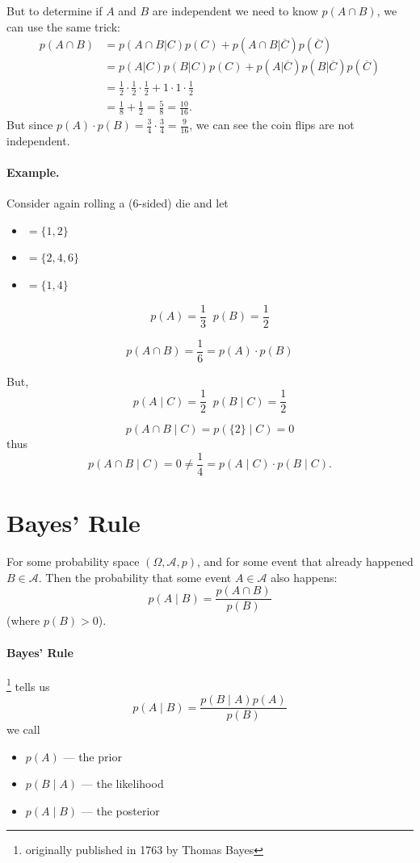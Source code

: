 But to determine if $A$ and $B$ are independent we need to know $p(A\cap B)$, we can use the same trick: 
\begin{align*}
p(A\cap B) &= p(A\cap B|C)p(C) + p(A\cap B|\overline{C})p(\overline{C})\\
	& = p(A|C)p(B|C)p(C) + p(A|\overline{C})p(B|\overline{C})p(\overline{C}) \\
	& = \frac{1}{2}\cdot\frac{1}{2}\cdot\frac{1}{2}+1\cdot1\cdot\frac{1}{2}\\
	& = \frac{1}{8} + \frac{1}{2} = \frac{5}{8} = \frac{10}{16}.
\end{align*}
But since $p(A)\cdot p(B) = \frac{3}{4}\cdot\frac{3}{4} = \frac{9}{16}$, 
we can see the coin flips are not independent. 

\paragraph{Example.} 
Consider again rolling a (6-sided) die and let 
\begin{itemize}
\item[$A$] $=\{1,2\}$
\item[$B$] $=\{2,4,6\}$
\item[$C$] $=\{1,4\}$
\end{itemize}

\[p(A) = \frac{1}{3} \;\; p(B)=\frac{1}{2}\]

\[p(A\cap B) = \frac{1}{6} = p(A)\cdot p(B)\]

But, 
\[p(A\mid C) = \frac{1}{2} \;\; p(B\mid C)=\frac{1}{2}\]

\[p(A\cap B\mid C) = p(\{2\}\mid C) = 0\]
thus 
\[p(A\cap B \mid C) = 0 \ne \frac{1}{4} = p(A\mid C) \cdot p(B\mid C).\]

\section{Bayes' Rule}

For some probability space $(\Omega, \mathcal{A}, p)$, and for some event that already happened $B\in\mathcal{A}.$
Then the probability that some event $A\in\mathcal{A}$ also happens:
\[p(A\mid B) = \frac{p(A\cap B)}{p(B)}\]
(where $p(B)>0$). 

\paragraph{Bayes' Rule}\footnote{originally published in 1763 by Thomas Bayes} tells us
\[p(A\mid B) = \frac{p(B\mid A)p(A)}{p(B)}\]
we call 
\begin{itemize}
\item[]$p(A)$ --- the prior
\item[]$p(B\mid A)$ --- the likelihood
\item[]$p(A\mid B)$ --- the posterior 
\end{itemize}


